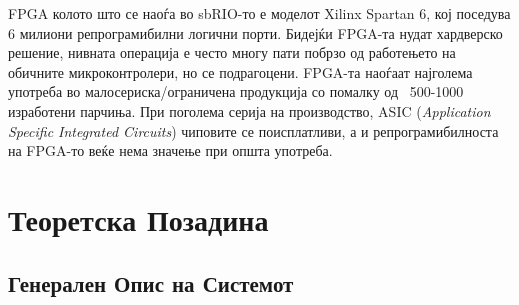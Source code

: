 \documentclass[12pt]{article}
\begin{document}
		  FPGA колото што се наоѓа во sbRIO-то е моделот Xilinx Spartan 6, кој поседува 6 милиони репрограмибилни логични порти. Бидејќи FPGA-та нудат хардверско решение, нивната операција е често многу пати побрзо од работењето на обичните микроконтролери, но се подрагоцени. FPGA-та наоѓаат најголема употреба во малосериска/ограничена продукција со помалку од ~500-1000 изработени парчиња. При поголема серија на производство, ASIC (\textit{Application Specific Integrated Circuits}) чиповите се поисплатливи, а и репрограмибилноста на FPGA-то веќе нема значење при општа употреба.

\newpage

\section{Теоретска Позадина}

  \subsection{Генерален Опис на Системот}
    \label{sec:general_desc}
\end{document}

